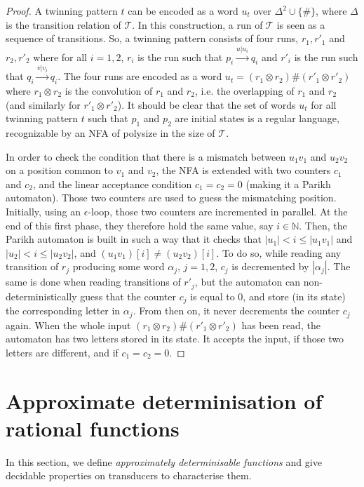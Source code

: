 \documentclass[a4paper,UKenglish,cleveref, autoref, thm-restate,authorcolumns, colorlinks]{lipics-v2021}
\newcommand\calT{\mathcal{T}}
\begin{document}
\begin{proof}
     A twinning pattern $t$ can be encoded as a word $u_t$ over $\Delta^2\cup\{\#\}$, where $\Delta$ is the transition relation of $\calT$. In this construction, a run of $\calT$ is seen as a sequence of transitions. So, a twinning pattern consists of four runs, $r_1,r'_1$ and $r_2,r'_2$ where for all $i=1,2$, $r_i$ is the run such that $p_i\xrightarrow{u|u_i}q_i$ and $r'_i$ is the run such that $q_i\xrightarrow{v|v_i}q_i$.
     The four runs are encoded as a word $u_t = (r_1\otimes r_2)\# (r'_1\otimes r'_2)$ where $r_1\otimes r_2$ is the convolution of $r_1$ and $r_2$, i.e. the overlapping of $r_1$ and $r_2$ (and similarly for $r'_1\otimes r'_2$).
    It should be clear that the set of words $u_t$ for all twinning pattern $t$ such that $p_1$ and $p_2$ are initial states is a regular language, recognizable by an NFA of polysize in the size of $\calT$.

    In order to check the condition that there is a mismatch between $u_1v_1$ and $u_2v_2$ on a position common to $v_1$ and $v_2$, the NFA is extended with two counters $c_1$ and $c_2$, and the linear acceptance condition $c_1=c_2=0$ (making it a Parikh automaton). Those two counters are used to guess the mismatching position. Initially, using an $\epsilon$-loop, those two counters are incremented in parallel. At the end of this first phase, they therefore hold the same value, say $i\in\mathbb{N}$. Then, the Parikh automaton is built in such a way that it checks that $|u_1|<i\leq |u_1v_1|$ and $|u_2|<i\leq |u_2v_2|$, and $(u_1v_1)[i]\neq (u_2v_2)[i]$. To do so, while reading any transition of $r_j$ producing some word $\alpha_j$, $j=1,2$, $c_j$ is decremented by $|\alpha_j|$. The same is done when reading transitions of $r'_j$, but the automaton can non-deterministically guess that the counter $c_j$ is equal to $0$, and store (in its state) the corresponding letter in $\alpha_j$.
    From then on, it never decrements the counter $c_j$ again.
    When the whole input $(r_1\otimes r_2)\# (r'_1\otimes r'_2)$ has been read, the automaton has two letters stored in its state. It accepts the input, if those two letters are different, and if $c_1=c_2=0$.
     \end{proof}
     

\section{Approximate determinisation of rational functions}

In this section, we define \emph{approximately determinisable functions} and give decidable properties on transducers to characterise them.
\end{document}
